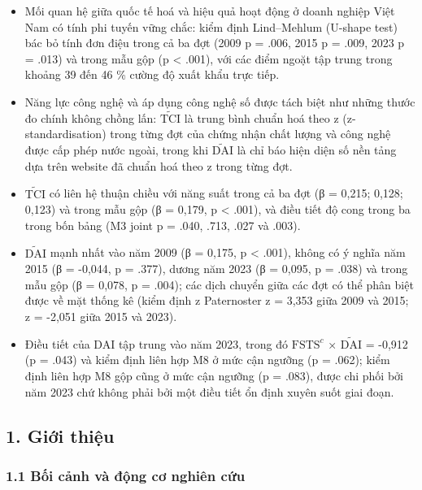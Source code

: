 \documentclass[12pt,a4paper]{article}
\begin{document}
\begin{itemize}
\item
  Mối quan hệ giữa quốc tế hoá và hiệu quả hoạt động ở doanh nghiệp Việt
  Nam có tính phi tuyến vững chắc: kiểm định Lind--Mehlum (U-shape test)
  bác bỏ tính đơn điệu trong cả ba đợt (2009 p = .006, 2015 p = .009,
  2023 p = .013) và trong mẫu gộp (p \textless{} .001), với các điểm
  ngoặt tập trung trong khoảng 39 đến 46 \% cường độ xuất khẩu trực
  tiếp.
\item
  Năng lực công nghệ và áp dụng công nghệ số được tách biệt như những
  thước đo chính không chồng lấn: \(\tilde{\mathrm{TCI}}\) là trung bình
  chuẩn hoá theo z (z-standardisation) trong từng đợt của chứng nhận
  chất lượng và công nghệ được cấp phép nước ngoài, trong khi
  \(\tilde{\mathrm{DAI}}\) là chỉ báo hiện diện số nền tảng dựa trên
  website đã chuẩn hoá theo z trong từng đợt.
\item
  \(\tilde{\mathrm{TCI}}\) có liên hệ thuận chiều với năng suất trong cả
  ba đợt (β = 0,215; 0,128; 0,123) và trong mẫu gộp (β = 0,179, p
  \textless{} .001), và điều tiết độ cong trong ba trong bốn bảng (M3
  joint p = .040, .713, .027 và .003).
\item
  \(\tilde{\mathrm{DAI}}\) mạnh nhất vào năm 2009 (β = 0,175, p
  \textless{} .001), không có ý nghĩa năm 2015 (β = -0,044, p = .377),
  dương năm 2023 (β = 0,095, p = .038) và trong mẫu gộp (β = 0,078, p =
  .004); các dịch chuyển giữa các đợt có thể phân biệt được về mặt thống
  kê (kiểm định z Paternoster z = 3,353 giữa 2009 và 2015; z = -2,051
  giữa 2015 và 2023).
\item
  Điều tiết của DAI tập trung vào năm 2023, trong đó
  \(\mathrm{FSTS}^{c}\) × \(\tilde{\mathrm{DAI}}\) = -0,912 (p = .043)
  và kiểm định liên hợp M8 ở mức cận ngưỡng (p = .062); kiểm định liên
  hợp M8 gộp cũng ở mức cận ngưỡng (p = .083), được chi phối bởi năm
  2023 chứ không phải bởi một điều tiết ổn định xuyên suốt giai đoạn.
\end{itemize}

\hypertarget{1-giux1edbi-thiux1ec7u}{%
\subsection{1. Giới thiệu}\label{1-giux1edbi-thiux1ec7u}}

\hypertarget{11-bux1ed1i-cux1ea3nh-vuxe0-ux111ux1ed9ng-cux1a1-nghiuxean-cux1ee9u}{%
\subsubsection{1.1 Bối cảnh và động cơ nghiên
cứu}\label{11-bux1ed1i-cux1ea3nh-vuxe0-ux111ux1ed9ng-cux1a1-nghiuxean-cux1ee9u}}
\end{document}
